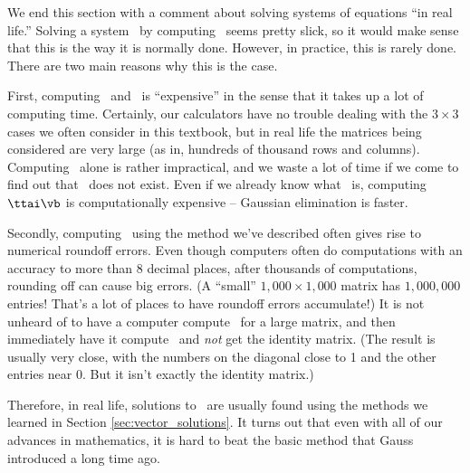 \smallskip

We end this section with a comment about solving systems of equations ``in real life.'' Solving a system \ttaxb\ by computing \ttai\vb\ seems pretty slick, so it would make sense that this is the way it is normally done. However, in practice, this is rarely done. There are two main reasons why this is the case.


First, computing \ttai\ and \ttai\vb\ is ``expensive'' in the sense that it takes up a lot of computing time. Certainly, our calculators have no trouble dealing with the $3 \times 3$ cases we often consider in this textbook, but in real life the matrices being considered are very large (as in, hundreds of thousand rows and columns). Computing \ttai\ alone is rather impractical, and we waste a lot of time if we come to find out that \ttai\ does not exist. Even if we already know what \ttai\ is, computing $\ttai\vb$ is computationally expensive -- Gaussian elimination is faster.

Secondly, computing \ttai\ using the method we've described often gives rise to numerical roundoff errors. Even though computers often do computations with an accuracy to more than 8 decimal places, after thousands of computations, rounding off can cause big errors. (A ``small'' $1,000 \times 1,000$ matrix has $1,000,000$ entries! That's a lot of places to have roundoff errors accumulate!) It is not unheard of to have a computer compute \ttai\ for a large matrix, and then immediately have it compute \tta\ttai\ and \textit{not} get the identity matrix. (The result is usually very close, with the numbers on the diagonal close to 1 and the other entries near 0. But it isn't exactly the identity matrix.)

Therefore, in real life, solutions to \ttaxb\ are usually found using the methods we learned in Section \ref{sec:vector_solutions}. It turns out that even with all of our advances in mathematics, it is hard to beat the basic method that Gauss introduced a long time ago.

